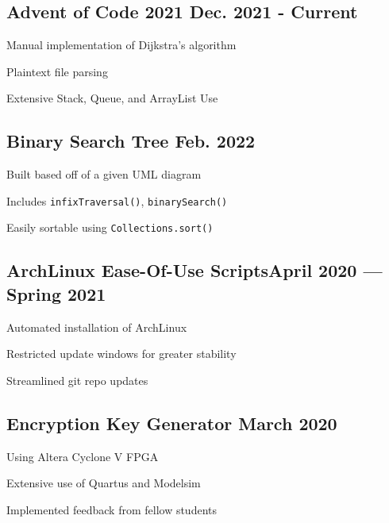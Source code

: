 \documentclass[letter,10pt]{article}
\begin{document}
\subsection{{Advent of Code 2021 \hfill Dec. 2021 - Current}}
\begin{zitemize}
	\item Manual implementation of Dijkstra's algorithm
	\item Plaintext file parsing
	\item Extensive Stack, Queue, and ArrayList Use
\end{zitemize}

\subsection{{Binary Search Tree \hfill Feb. 2022}}
\begin{zitemize}
	\item Built based off of a given UML diagram
	\item Includes \verb|infixTraversal()|, \verb|binarySearch()|
	\item Easily sortable using \verb|Collections.sort()|
\end{zitemize}

\subsection{{ArchLinux Ease-Of-Use Scripts\hfill April 2020 --- Spring 2021}}
\begin{zitemize}
	\item Automated installation of ArchLinux
	\item Restricted update windows for greater stability
	\item Streamlined git repo updates
\end{zitemize}

\subsection{{Encryption Key Generator \hfill March 2020}}
\begin{zitemize}
	\item Using Altera Cyclone V FPGA
	\item Extensive use of Quartus and Modelsim
	\item Implemented feedback from fellow students
\end{zitemize}
\end{document}
